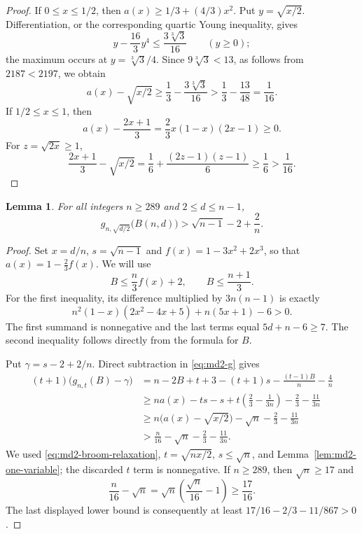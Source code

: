 \documentclass[11pt,a4paper]{article}
\newtheorem{lemma}[theorem]{Lemma}
\theoremstyle{remark}\newtheorem{remark}[theorem]{Remark}
\begin{document}
\begin{proof}
If $0\le x\le1/2$, then $a(x)\ge1/3+(4/3)x^2$.
Put $y=\sqrt{x/2}$. Differentiation, or the corresponding quartic
Young inequality, gives
\[
 y-\frac{16}{3}y^4\le\frac{3\sqrt[3]{3}}{16}
 \qquad(y\ge0);
\]
the maximum occurs at $y=\sqrt[3]{3}/4$. Since
$9\sqrt[3]{3}<13$, as follows from $2187<2197$, we obtain
\[
 a(x)-\sqrt{x/2}
 \ge\frac13-\frac{3\sqrt[3]{3}}{16}
 >\frac13-\frac{13}{48}=\frac1{16}.
\]
If $1/2\le x\le1$, then
\[
 a(x)-\frac{2x+1}{3}
 =\frac23x(1-x)(2x-1)\ge0.
\]
For $z=\sqrt{2x}\ge1$,
\[
 \frac{2x+1}{3}-\sqrt{x/2}
 =\frac16+\frac{(2z-1)(z-1)}6
 \ge\frac16>\frac1{16}.
\]
\end{proof}

\begin{lemma}\label{lem:md2-large}
For all integers $n\ge289$ and $2\le d\le n-1$,
\[
 g_{n,\sqrt{d/2}}\bigl(B(n,d)\bigr)
 >\sqrt{n-1}-2+\frac2n.
\]
\end{lemma}

\begin{proof}
Set $x=d/n$, $s=\sqrt{n-1}$ and
$f(x)=1-3x^2+2x^3$, so that $a(x)=1-\frac23f(x)$.
We will use
\begin{equation}\label{eq:md2-broom-relaxation}
 B\le\frac n3f(x)+2,\qquad B\le\frac{n+1}{3}.
\end{equation}
For the first inequality, its difference multiplied by $3n(n-1)$
is exactly
\[
 n^2(1-x)(2x^2-4x+5)+n(5x+1)-6>0.
\]
The first summand is nonnegative and the last terms equal
$5d+n-6\ge7$. The second inequality follows directly from the formula
for $B$.

Put $\gamma=s-2+2/n$. Direct subtraction in \eqref{eq:md2-g} gives
\[
 \begin{aligned}
 (t+1)\bigl(g_{n,t}(B)-\gamma\bigr)
 &=n-2B+t+3-(t+1)s-\frac{(t-1)B}{n}-\frac4n\\
 &\ge na(x)-ts-s
   +t\left(\frac23-\frac1{3n}\right)-\frac23-\frac{11}{3n}\\
 &\ge n\bigl(a(x)-\sqrt{x/2}\bigr)
       -\sqrt n-\frac23-\frac{11}{3n}\\
 &>\frac n{16}-\sqrt n-\frac23-\frac{11}{3n}.
 \end{aligned}
\]
We used \eqref{eq:md2-broom-relaxation}, $t=\sqrt{nx/2}$,
$s\le\sqrt n$, and Lemma~\ref{lem:md2-one-variable}; the discarded
$t$ term is nonnegative. If $n\ge289$, then $\sqrt n\ge17$ and
\[
 \frac n{16}-\sqrt n
 =\sqrt n\left(\frac{\sqrt n}{16}-1\right)\ge\frac{17}{16}.
\]
The last displayed lower bound is consequently at least
$17/16-2/3-11/867>0$.
\end{proof}
\end{document}

